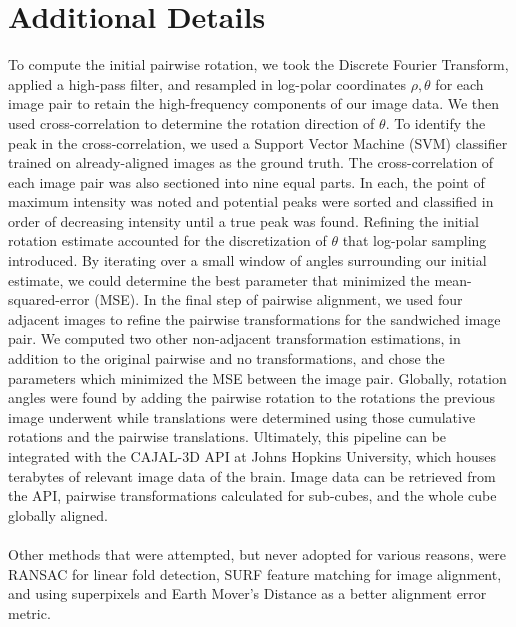 \documentclass{article}
\begin{document}
\section{Additional Details}
To compute the initial pairwise rotation, we took the Discrete Fourier Transform, applied a high-pass filter, and resampled in log-polar coordinates $\rho,\theta$ for each image pair to retain the high-frequency components of our image data. We then used cross-correlation to determine the rotation direction of $\theta$. To identify the peak in the cross-correlation, we used a Support Vector Machine (SVM) classifier trained on already-aligned images as the ground truth. The cross-correlation of each image pair was also sectioned into nine equal parts. In each, the point of maximum intensity was noted and potential peaks were sorted and classified in order of decreasing intensity until a true peak was found. Refining the initial rotation estimate accounted for the discretization of $\theta$ that log-polar sampling introduced. By iterating over a small window of angles surrounding our initial estimate, we could determine the best parameter that minimized the mean-squared-error (MSE). In the final step of pairwise alignment, we used four adjacent images to refine the pairwise transformations for the sandwiched image pair. We computed two other non-adjacent transformation estimations, in addition to the original pairwise and no transformations, and chose the parameters which minimized the MSE between the image pair. Globally, rotation angles were found by adding the pairwise rotation to the rotations the previous image underwent while translations were determined using those cumulative rotations and the pairwise translations. Ultimately, this pipeline can be integrated with the CAJAL-3D API at Johns Hopkins University, which houses terabytes of relevant image data of the brain. Image data can be retrieved from the API, pairwise transformations calculated for sub-cubes, and the whole cube globally aligned.\\
\\
Other methods that were attempted, but never adopted for various reasons, were RANSAC for linear fold detection, SURF feature matching for image alignment, and using superpixels and Earth Mover's Distance as a better alignment error metric. 
\end{document}
